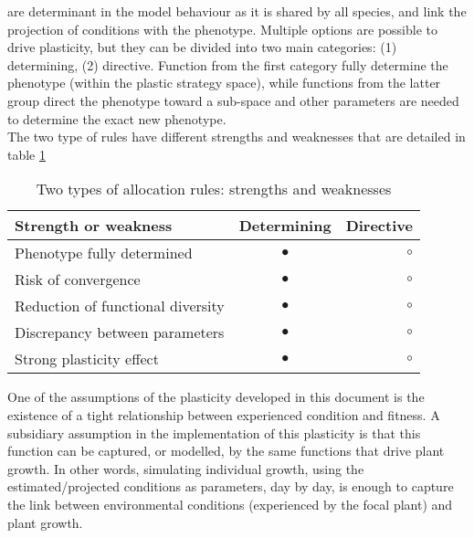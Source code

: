  are determinant in the model behaviour as it is shared by all species, and link the projection of conditions with the phenotype. Multiple options are possible to drive plasticity, but they can be divided into two main categories: (1) determining, (2) directive. Function from the first category fully determine the phenotype (within the plastic strategy space), while functions from the latter group direct the phenotype toward a sub-space and other parameters are needed to determine the exact new phenotype.\\
The two type of rules have different strengths and weaknesses that are detailed in table \ref{table:allocation_rules}

\begin{table}
\caption{Two types of allocation rules: strengths and weaknesses} 
\label{table:allocation_rules}
\begin{center}%
\begin{tabular}{l c r}
Strength or weakness & Determining & Directive \\ 
\hline 
Phenotype fully determined & \textcolor{myGreen}{$\bullet$} & $\circ$ \\
Risk of convergence & $\bullet$ &  $\circ$ \\
Reduction of functional diversity & $\bullet$ &  $\circ$\\
Discrepancy between parameters & $\bullet$ &  $\circ$\\
Strong plasticity effect & \textcolor{myGreen}{$\bullet$} & $\circ$
\end{tabular} 
\end{center}
\vspace*{0.5cm}
\end{table}


One of the assumptions of the plasticity developed in this document is the existence of a tight relationship between experienced condition and fitness. A subsidiary assumption in the implementation of this plasticity is that this function can be captured, or modelled, by the same functions that drive plant growth. In other words, simulating individual growth, using the estimated/projected conditions as parameters, day by day, is enough to capture the link between environmental conditions (experienced by the focal plant) and plant growth. 


